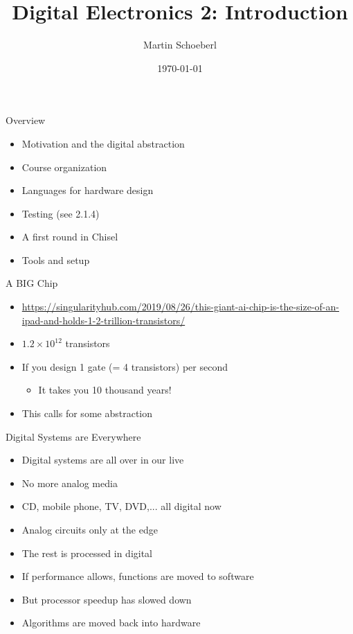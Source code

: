 \documentclass[xcolor=pdflatex,dvipsnames,table]{beamer}
\title{Digital Electronics 2: Introduction}
\author{Martin Schoeberl}
\date{\today}
\institute{Technical University of Denmark\\
Embedded Systems Engineering}
\begin{document}
\begin{frame}
\titlepage
\end{frame}


\begin{frame}[fragile]{Overview}
\begin{itemize}
\item Motivation and the digital abstraction
\item Course organization
\item Languages for hardware design
\item Testing (see 2.1.4)
\item A first round in Chisel
\item Tools and setup
\end{itemize}
\end{frame}


\begin{frame}[fragile]{A BIG Chip}
\begin{itemize}
\item \url{https://singularityhub.com/2019/08/26/this-giant-ai-chip-is-the-size-of-an-ipad-and-holds-1-2-trillion-transistors/}
\item $1.2 \times 10^{12}$ transistors
\item If you design 1 gate (= 4 transistors) per second
\begin{itemize}
\item It takes you 10 thousand years!
\end{itemize}
\item This calls for some abstraction
\end{itemize}
\end{frame}

\begin{frame}[fragile]{Digital Systems are Everywhere}
\begin{itemize}
\item Digital systems are all over in our live
\item No more analog media
\item CD, mobile phone, TV, DVD,... all digital now
\item Analog circuits only at the edge
\item The rest is processed in digital
\item If performance allows, functions are moved to software
\item But processor speedup has slowed down
\item Algorithms are moved back into hardware
\end{itemize}
\end{frame}
\end{document}
